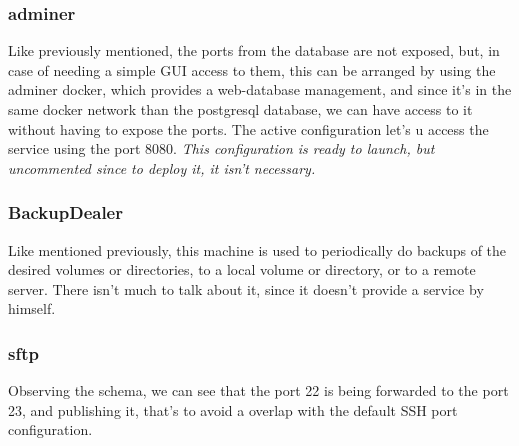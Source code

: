 \documentclass[11pt]{article}
\begin{document}
    \subsubsection[Adminer]{adminer}
    \begin{flushleft}
        Like previously mentioned, the ports from the database are not exposed, but, in case of needing a simple GUI
        access to them, this can be arranged by using the adminer docker, which provides a web-database management,
        and since it's in the same docker network than the postgresql database, we can have access to it without having
        to expose the ports.
        The active configuration let's u access the service using the port 8080.
        \textit{This configuration is ready to launch, but uncommented since to deploy it, it isn't necessary.}
    \end{flushleft}

    \subsubsection[Backup\_dealer]{BackupDealer}
    \begin{flushleft}
       Like mentioned previously, this machine is used to periodically do backups of the desired volumes or directories,
       to a local volume or directory, or to a remote server.
       There isn't much to talk about it, since it doesn't provide a service by himself.
    \end{flushleft}

    \subsubsection[sftp]{sftp}
    \begin{flushleft}
        Observing the schema, we can see that the port 22 is being forwarded to the port 23, and publishing it, that's
        to avoid a overlap with the default SSH port configuration.
    \end{flushleft}
\end{document}
